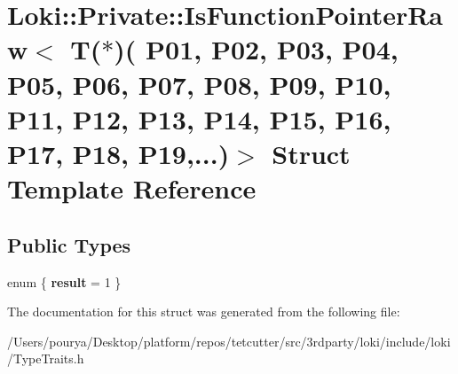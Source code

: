 \hypertarget{structLoki_1_1Private_1_1IsFunctionPointerRaw_3_01T_07_5_08_07_01_01_01_01_01_01_01_01_01_01_01_fe03a220c84bfd43421ed00519d1dedb}{}\section{Loki\+:\+:Private\+:\+:Is\+Function\+Pointer\+Raw$<$ T($\ast$)( P01, P02, P03, P04, P05, P06, P07, P08, P09, P10, P11, P12, P13, P14, P15, P16, P17, P18, P19,...)$>$ Struct Template Reference}
\label{structLoki_1_1Private_1_1IsFunctionPointerRaw_3_01T_07_5_08_07_01_01_01_01_01_01_01_01_01_01_01_fe03a220c84bfd43421ed00519d1dedb}
\subsection*{Public Types}
\begin{DoxyCompactItemize}
\item 
\hypertarget{structLoki_1_1Private_1_1IsFunctionPointerRaw_3_01T_07_5_08_07_01_01_01_01_01_01_01_01_01_01_01_fe03a220c84bfd43421ed00519d1dedb_a1446778a86e44cbef1d4e147d4db97d6}{}enum \{ {\bfseries result} = 1
 \}\label{structLoki_1_1Private_1_1IsFunctionPointerRaw_3_01T_07_5_08_07_01_01_01_01_01_01_01_01_01_01_01_fe03a220c84bfd43421ed00519d1dedb_a1446778a86e44cbef1d4e147d4db97d6}

\end{DoxyCompactItemize}


The documentation for this struct was generated from the following file\+:\begin{DoxyCompactItemize}
\item 
/\+Users/pourya/\+Desktop/platform/repos/tetcutter/src/3rdparty/loki/include/loki/Type\+Traits.\+h\end{DoxyCompactItemize}
